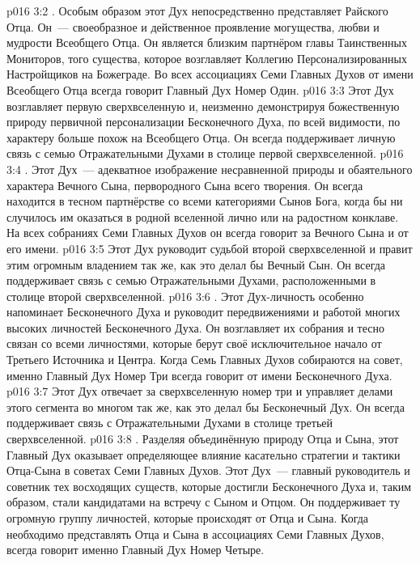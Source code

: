 \vs p016 3:2 . Особым образом этот Дух непосредственно представляет Райского Отца. Он~--- своеобразное и действенное проявление могущества, любви и мудрости Всеобщего Отца. Он является близким партнёром главы Таинственных Мониторов, того существа, которое возглавляет Коллегию Персонализированных Настройщиков на Божеграде. Во всех ассоциациях Семи Главных Духов от имени Всеобщего Отца всегда говорит Главный Дух Номер Один.
\vs p016 3:3 Этот Дух возглавляет первую сверхвселенную и, неизменно демонстрируя божественную природу первичной персонализации Бесконечного Духа, по всей видимости, по характеру больше похож на Всеобщего Отца. Он всегда поддерживает личную связь с семью Отражательными Духами в столице первой сверхвселенной.
\vs p016 3:4 \pc {}. Этот Дух~--- адекватное изображение несравненной природы и обаятельного характера Вечного Сына, первородного Сына всего творения. Он всегда находится в тесном партнёрстве со всеми категориями Сынов Бога, когда бы ни случилось им оказаться в родной вселенной лично или на радостном конклаве. На всех собраниях Семи Главных Духов он всегда говорит за Вечного Сына и от его имени.
\vs p016 3:5 Этот Дух руководит судьбой второй сверхвселенной и правит этим огромным владением так же, как это делал бы Вечный Сын. Он всегда поддерживает связь с семью Отражательными Духами, расположенными в столице второй сверхвселенной.
\vs p016 3:6 \pc {}. Этот Дух\hyp{}личность особенно напоминает Бесконечного Духа и руководит передвижениями и работой многих высоких личностей Бесконечного Духа. Он возглавляет их собрания и тесно связан со всеми личностями, которые берут своё исключительное начало от Третьего Источника и Центра. Когда Семь Главных Духов собираются на совет, именно Главный Дух Номер Три всегда говорит от имени Бесконечного Духа.
\vs p016 3:7 Этот Дух отвечает за сверхвселенную номер три и управляет делами этого сегмента во многом так же, как это делал бы Бесконечный Дух. Он всегда поддерживает связь с Отражательными Духами в столице третьей сверхвселенной.
\vs p016 3:8 \pc {}. Разделяя объединённую природу Отца и Сына, этот Главный Дух оказывает определяющее влияние касательно стратегии и тактики Отца\hyp{}Сына в советах Семи Главных Духов. Этот Дух~--- главный руководитель и советник тех восходящих существ, которые достигли Бесконечного Духа и, таким образом, стали кандидатами на встречу с Сыном и Отцом. Он поддерживает ту огромную группу личностей, которые происходят от Отца и Сына. Когда необходимо представлять Отца и Сына в ассоциациях Семи Главных Духов, всегда говорит именно Главный Дух Номер Четыре.

